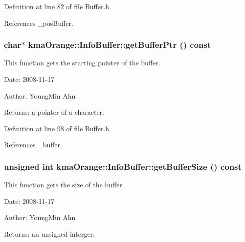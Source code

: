Definition at line 82 of file Buffer.h.

References \_\-posBuffer.\hypertarget{classkmaOrange_1_1InfoBuffer_493b3235a28c09c017b00c7bf43b97b5}{
\subsubsection[{getBufferPtr}]{\setlength{\rightskip}{0pt plus 5cm}char$\ast$ kmaOrange::InfoBuffer::getBufferPtr () const}}
\label{classkmaOrange_1_1InfoBuffer_493b3235a28c09c017b00c7bf43b97b5}


This function gets the starting pointer of the buffer. 

\begin{Desc}
\item[Date:]2008-11-17 \end{Desc}
\begin{Desc}
\item[Author:]YoungMin Ahn \end{Desc}
\begin{Desc}
\item[Returns:]a pointer of a character. \end{Desc}


Definition at line 98 of file Buffer.h.

References \_\-buffer.\hypertarget{classkmaOrange_1_1InfoBuffer_b031f0f097be5250b9133aeac71c2504}{
\subsubsection[{getBufferSize}]{\setlength{\rightskip}{0pt plus 5cm}unsigned int kmaOrange::InfoBuffer::getBufferSize () const}}
\label{classkmaOrange_1_1InfoBuffer_b031f0f097be5250b9133aeac71c2504}


This function gets the size of the buffer. 

\begin{Desc}
\item[Date:]2008-11-17 \end{Desc}
\begin{Desc}
\item[Author:]YoungMin Ahn \end{Desc}
\begin{Desc}
\item[Returns:]an unsigned interger. \end{Desc}


